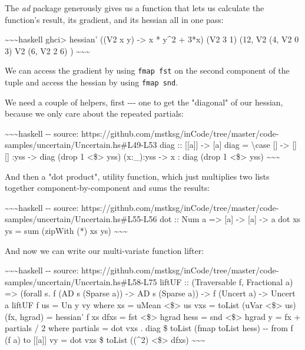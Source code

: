 \documentclass[]{article}
\begin{document}
The \emph{ad} package generously gives us a function that lets us calculate the
function's result, its gradient, and its hessian all in one pass:

\textasciitilde{}\textasciitilde{}\textasciitilde{}haskell ghci\textgreater{}
hessian' ((V2 x y) -\textgreater{} x * y\^{}2 + 3*x) (V2 3 1) (12, V2 (4, V2 0
3) V2 (6, V2 2 6) ) \textasciitilde{}\textasciitilde{}\textasciitilde{}

We can access the gradient by using \texttt{fmap\ fst} on the second component
of the tuple and access the hessian by using \texttt{fmap\ snd}.

We need a couple of helpers, first -\/-\/- one to get the "diagonal" of our
hessian, because we only care about the repeated partials:

\textasciitilde{}\textasciitilde{}\textasciitilde{}haskell -\/- source:
https://github.com/mstksg/inCode/tree/master/code-samples/uncertain/Uncertain.hs\#L49-L53
diag :: {[}{[}a{]}{]} -\textgreater{} {[}a{]} diag = \textbackslash{}case {[}{]}
-\textgreater{} {[}{]} {[}{]} :yss -\textgreater{} diag (drop 1
\textless{}\$\textgreater{} yss) (x:\_):yss -\textgreater{} x : diag (drop 1
\textless{}\$\textgreater{} yss)
\textasciitilde{}\textasciitilde{}\textasciitilde{}

And then a "dot product", utility function, which just multiplies two lists
together component-by-component and sums the results:

\textasciitilde{}\textasciitilde{}\textasciitilde{}haskell -\/- source:
https://github.com/mstksg/inCode/tree/master/code-samples/uncertain/Uncertain.hs\#L55-L56
dot :: Num a =\textgreater{} {[}a{]} -\textgreater{} {[}a{]} -\textgreater{} a
dot xs ys = sum (zipWith (*) xs ys)
\textasciitilde{}\textasciitilde{}\textasciitilde{}

And now we can write our multi-variate function lifter:

\textasciitilde{}\textasciitilde{}\textasciitilde{}haskell -\/- source:
https://github.com/mstksg/inCode/tree/master/code-samples/uncertain/Uncertain.hs\#L58-L75
liftUF :: (Traversable f, Fractional a) =\textgreater{} (forall s. f (AD s
(Sparse a)) -\textgreater{} AD s (Sparse a)) -\textgreater{} f (Uncert a)
-\textgreater{} Uncert a liftUF f us = Un y vy where xs = uMean
\textless{}\$\textgreater{} us vxs = toList (uVar \textless{}\$\textgreater{}
us) (fx, hgrad) = hessian' f xs dfxs = fst \textless{}\$\textgreater{} hgrad
hess = snd \textless{}\$\textgreater{} hgrad y = fx + partials / 2 where
partials = dot vxs . diag \$ toList (fmap toList hess) -\/- from f (f a) to
{[}{[}a{]}{]} vy = dot vxs \$ toList ((\^{}2) \textless{}\$\textgreater{} dfxs)
\textasciitilde{}\textasciitilde{}\textasciitilde{}
\end{document}
